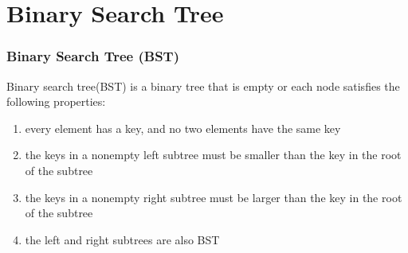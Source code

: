 \documentclass[newPxFont,sthlmFooter,nooffset]{beamer}
\begin{document}
\section{Binary Search Tree}
\begin{frame}[t]
  \frametitle{Binary Search Tree (BST)}
Binary search tree(BST) is a binary tree that is empty or each
node satisfies the following properties:
\begin{enumerate}
\item every element has a key, and no two elements have the same key
\item the keys in a nonempty left subtree must be smaller than the key
  in the root of the subtree
\item the keys in a nonempty right subtree
  must be larger than the key in the root of the subtree
\item the left and right subtrees are also BST
\end{enumerate}

\end{frame}
\end{document}
